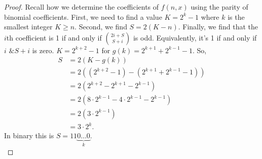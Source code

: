 \documentclass{article}
\begin{document}
	\begin{proof}
		Recall how we determine the coefficients of $f(n,x)$ using the parity of binomial coefficients.
		First, we need to find a value $K = 2^{k} - 1$ where $k$ is the smallest integer $K \geq n$.
		Second, we find $S = 2(K - n)$.
		Finally, we find that the $i$th coefficient is 1 if and only if $\binom{2i+S}{S+i}$ is odd. Equivalently, it's 1 if and only if $i \texttt{ \& } S+i$ is zero.
		$K = 2^{k+2} - 1$ for $g(k) = 2^{k+1} + 2^{k-1} - 1$.
		So,
		\begin{align*}
			S &= 2(K - g(k)) \\
			&= 2\left((2^{k+2}-1) - (2^{k+1} + 2^{k-1} - 1)\right) \\
			&= 2\left(2^{k+2} - 2^{k+1} - 2^{k-1}\right) \\
			&= 2\left(8\cdot2^{k-1} - 4\cdot2^{k-1} - 2^{k-1}\right) \\
			&= 2\left(3\cdot2^{k-1}\right) \\
			&= 3\cdot2^k.
		\end{align*}
		In binary this is $S = 11\underbrace{0 \dots 0}_{k}$. \\
		

\end{proof}
\end{document}
